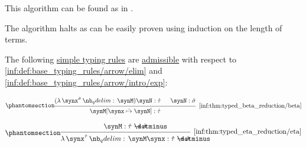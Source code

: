\begin{comments}
  \item This algorithm can be found as  in \cite{notebook:code}.
\end{comments}
\begin{defproof}
  The algorithm halts as can be easily proven using induction on the length of terms.
\end{defproof}

\begin{proposition}\label{thm:reduction_typing_rules}
  The following \hyperref[def:simple_typing_rule]{simple typing rules} are \hyperref[con:inference_rule_admissibility]{admissible} with respect to \ref{inf:def:base_typing_rules/arrow/elim} and \ref{inf:def:base_typing_rules/arrow/intro/exp}:
  \begin{paracol}{2}
    \begin{leftcolumn}
      \begin{equation*}\taglabel[\ensuremath{ \rightarrow_\beta }]{inf:thm:typed_beta_reduction/beta}
        \begin{prooftree}
          \hypo{ (\qabs {\synx^{\syn\sigma}} \synM) \synN: \syn\tau }
          \hypo{ \synN: \syn\sigma }
          \infer2[\ref{inf:thm:typed_beta_reduction/beta}]{ \synM[\synx \synsubst \synN]: \syn\tau }.
        \end{prooftree}
      \end{equation*}
    \end{leftcolumn}

    \begin{rightcolumn}
      \begin{equation*}\taglabel[\ensuremath{ \leftarrow_\eta }]{inf:thm:typed_eta_reduction/eta}
        \begin{prooftree}
          \hypo{ \synM: \syn\tau \synimplies \syn\sigma }
          \infer1[\ref{inf:thm:typed_eta_reduction/eta}]{ \qabs {\synx^{\syn\tau}} \synM \synx: \syn\tau \synimplies \syn\sigma }.
        \end{prooftree}
      \end{equation*}
    \end{rightcolumn}
  \end{paracol}
\end{proposition}
